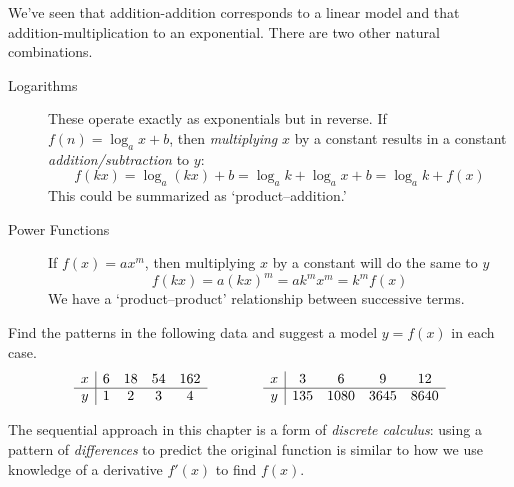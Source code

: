 We've seen that addition-addition corresponds to a linear model and that addition-multiplication to an exponential. There are two other natural combinations.

\begin{description}
	\item[Logarithms] These operate exactly as exponentials but in reverse. If $f(n)=\log_a x+b$, then \emph{multiplying} $x$ by a constant results in a constant \emph{addition/subtraction} to $y$:
		\[
			f(kx)=\log_a(kx)+b=\log_ak+\log_ax+b=\log_ak+f(x)
		\]
		This could be summarized as `product--addition.'
	\item[Power Functions] If $f(x)=ax^m$, then multiplying $x$ by a constant will do the same to $y$
		\[
			f(kx)=a(kx)^m=ak^mx^m=k^mf(x)
		\]
		We have a `product--product' relationship between successive terms.
\end{description}


\begin{examples}{}{}
	Find the patterns in the following data and suggest a model $y=f(x)$ in each case.
	\[
		\begin{array}[t]{c|cccc}
			x&6&18&54&162\\\hline
			y&1&2&3&4
		\end{array}
		\qquad\qquad
		\begin{array}[t]{c|cccc}
			x&3&6&9&12\\\hline
			y&135&1080&3645&8640
		\end{array}
	\]
\end{examples}

The sequential approach in this chapter is a form of \emph{discrete calculus}: using a pattern of \emph{differences} to predict the original function is similar to how we use knowledge of a derivative $f'(x)$ to find $f(x)$.

\goodbreak


